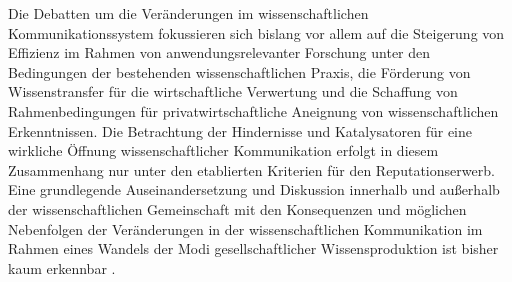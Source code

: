 Die Debatten um die Veränderungen im wissenschaftlichen Kommunikationssystem fokussieren sich bislang vor allem auf die Steigerung von Effizienz im Rahmen von anwendungsrelevanter Forschung unter den Bedingungen der bestehenden wissenschaftlichen Praxis, die Förderung von Wissenstransfer für die wirtschaftliche Verwertung und die Schaffung von Rahmenbedingungen für privatwirtschaftliche Aneignung von wissenschaftlichen Erkenntnissen. Die Betrachtung der Hindernisse und Katalysatoren für eine wirkliche Öffnung wissenschaftlicher Kommunikation erfolgt in diesem Zusammenhang nur unter den etablierten Kriterien für den Reputationserwerb. Eine grundlegende Auseinandersetzung und Diskussion innerhalb und außerhalb der wissenschaftlichen Gemeinschaft mit den Konsequenzen und möglichen Nebenfolgen der Veränderungen in der wissenschaftlichen Kommunikation im Rahmen eines Wandels der Modi gesellschaftlicher Wissensproduktion ist bisher kaum erkennbar \cite{Buss_2001}.
